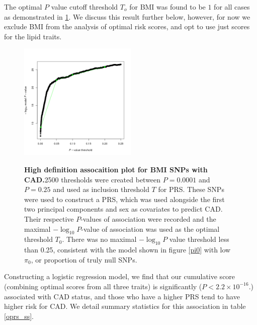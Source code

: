The optimal $P$ value cutoff threshold $T_o$ for \ac{BMI} was found to be $1$ for all cases as demonstrated in \ref{oprs_bmi}. We discuss this result further below, however, for now we exclude \ac{BMI} from the analysis of optimal risk scores, and opt to use just scores for the lipid traits.

\begin{figure}[H]
\centering
\includegraphics[width=0.5\textwidth]{Figures/PRSice_HIGH-RES_PLOT_2016-04-23.png}
\label{oprs_bmi}
\caption[Optimal $P$-value inclusion threshold for \ac{BMI}.]{\textbf{High definition assocaition plot for \ac{BMI} \acp{SNP} with \ac{CAD}.}2500 thresholds were created between $P = 0.0001$ and $P = 0.25$ and used as inclusion threshold $T$ for \ac{PRS}. These \acp{SNP} were used to construct a \ac{PRS}, which was used alongside the first two principal components and sex as covariates to predict \ac{CAD}. Their respective $P$-values of association were recorded and the maximal $-\log_{10} P$-value of association was used as the optimal threshold $T_0$. There was no maximal $-\log_{10} P$ value threshold less than 0.25, consistent with the model shown in figure \ref{pi0} with low $\pi_0$, or proportion of truly null \acp{SNP}.}
\end{figure}

Constructing a logistic regression model, we find that our cumulative score (combining optimal scores from all three traits) is significantly ($P < 2.2 \times 10^{-16}$.) associated with \ac{CAD} status, and those who have a higher \ac{PRS} tend to have higher risk for \ac{CAD}. We detail summary statistics for this association in table \ref{oprs_ss}. 



